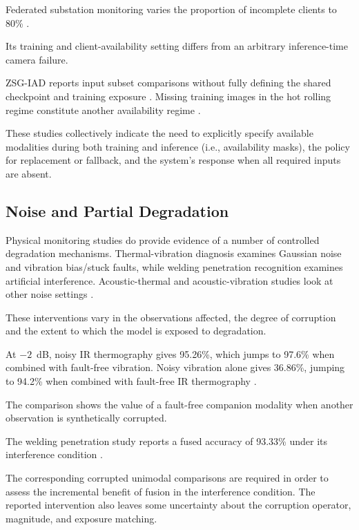 Federated substation monitoring varies the proportion of incomplete clients to 80\% \citep[PDF
p.~29, Figure~8]{P051}.

Its training and client-availability setting differs from an arbitrary inference-time camera
failure.

ZSG-IAD reports input subset comparisons without fully defining the shared checkpoint and training
exposure \citep{P025}. Missing training images in the hot rolling regime constitute another
availability regime \citep{Ma2025A}.

These studies collectively indicate the need to explicitly specify available modalities during both
training and inference (i.e., availability masks), the policy for replacement or fallback, and the
system's response when all required inputs are absent.

\subsection{Noise and Partial Degradation}

Physical monitoring studies do provide evidence of a number of controlled degradation mechanisms.
Thermal-vibration diagnosis examines Gaussian noise and vibration bias/stuck faults, while welding
penetration recognition examines artificial interference. Acoustic-thermal and acoustic-vibration
studies look at other noise settings
\citep{Huo2022Multisensor,Hua2026Weld,Ying2025Trustworthy,Huang2026Rolling}.

These interventions vary in the observations affected, the degree of corruption and the extent to
which the model is exposed to degradation.

At $-2$~dB, noisy IR thermography gives 95.26\%, which jumps to 97.6\% when combined with fault-free
vibration. Noisy vibration alone gives 36.86\%, jumping to 94.2\% when combined with fault-free IR
thermography \citep[PDF p.~7, Table~VIII]{Huo2022Multisensor}.

The comparison shows the value of a fault-free companion modality when another observation is
synthetically corrupted.

The welding penetration study reports a fused accuracy of 93.33\% under its interference condition
\citep[PDF pp.~18, 22, Tables~1--3]{Hua2026Weld}.

The corresponding corrupted unimodal comparisons are required in order to assess the incremental
benefit of fusion in the interference condition. The reported intervention also leaves some
uncertainty about the corruption operator, magnitude, and exposure matching.


